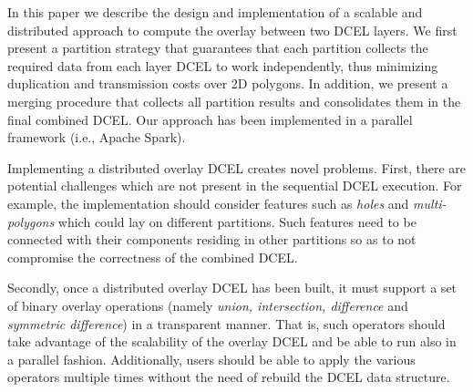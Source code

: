 

In this paper we describe the design and implementation of a scalable and distributed approach to compute the overlay between two DCEL layers. We first present a partition strategy that guarantees that each partition collects the required data from each layer DCEL to work independently, thus minimizing duplication and transmission costs over 2D polygons.  In addition, we present a merging procedure that collects all partition results and consolidates them in the final combined DCEL.  
Our approach has been implemented in a parallel framework (i.e., Apache Spark). 

Implementing a distributed overlay DCEL creates novel problems. First, there are potential challenges which are not present in the sequential DCEL execution. For example, the implementation should consider features such as \textit{holes} and \textit{multi-polygons} which could lay on different partitions.  Such features need to be connected with their components residing in other partitions so as to not compromise the correctness of the combined DCEL.  %

Secondly, once a distributed overlay DCEL has been built, it must support a set of binary overlay operations (namely \textit{union, intersection, difference} and \textit{symmetric difference}) in a transparent manner.  That is, such operators should take advantage of the scalability of the overlay DCEL and be able to run also in a parallel fashion.  Additionally, users should be able to apply the various operators multiple times without the need of rebuild the DCEL data structure.  %

